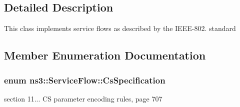 \subsection{Detailed Description}
This class implements service flows as described by the I\+E\+E\+E-\/802. standard 

\subsection{Member Enumeration Documentation}
\subsubsection[{\texorpdfstring{Cs\+Specification}{CsSpecification}}]{\setlength{\rightskip}{0pt plus 5cm}enum {\bf ns3\+::\+Service\+Flow\+::\+Cs\+Specification}}\hypertarget{classns3_1_1ServiceFlow_ad87f7547b7c053db4472543e17d21952}{}\label{classns3_1_1ServiceFlow_ad87f7547b7c053db4472543e17d21952}


section 11... CS parameter encoding rules, page 707 

